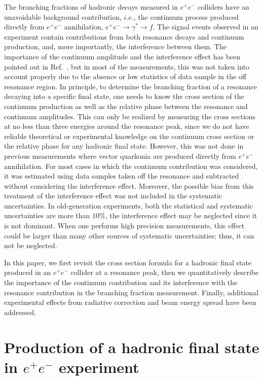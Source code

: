 \documentclass[%
preprint,
 amsmath,amssymb,
 aps,
]{revtex4-2}
\newcommand{\EE}{e^+e^-}
\begin{document}
The branching fractions of hadronic decays measured in $\EE$ colliders have an 
unavoidable background contribution, $i.e.$, the continuum process produced 
directly from $\EE$ annihilation, $\EE\to\gamma^{*}\to f$. 
The signal events observed in an experiment contain contributions from both 
resonance decays and continuum production, and, more importantly, the interference 
between them. The importance of the continuum amplitude and the interference effect 
has been pointed out in Ref.~\cite{WYMZ-inter-2004}, but 
in most of the measurements, this was not taken into account properly due to the absence
or low statistics of data sample in the off resonance region.
In principle, to determine the branching fraction of a resonance decaying into 
a specific final state, one needs to know the cross section of the continuum 
production as well as the relative phase between 
the resonance and continuum amplitudes. This can only be realized by measuring 
the cross sections at no less than three energies around the resonance peak, since we 
do not have reliable theoretical or experimental knowledge on the continuum cross section
or the relative phase for any hadronic final state. However, this was not done in previous 
measurements where vector quarkonia are 
produced directly from $\EE$ annihilation.
For most cases in which the continuum contribution was considered, 
it was estimated using data samples taken off the resonance and subtracted without 
considering the interference effect. Moreover, the possible bias 
from this treatment of the interference effect was not included in
the systematic uncertainties. In old-generation experiments, both the 
statistical and systematic uncertainties are more than $10\%$, the interference effect 
may be neglected since it is not dominant. When one performs high precision measurements, 
this effect could be larger than many other sources of systematic uncertainties; thus, it 
can not be neglected. 

In this paper, we first revisit the cross section formula for a hadronic final state produced 
in an $\EE$ collider at a resonance peak, then we quantitatively describe
the importance of the continuum contribution and its interference 
with the resonance contribution in the branching fraction measurement. 
Finally, additional experimental effects from radiative correction and beam energy 
spread have been addressed.

\section{Production of a hadronic final state in $\EE$ experiment}
\label{ch:formula}
\end{document}
